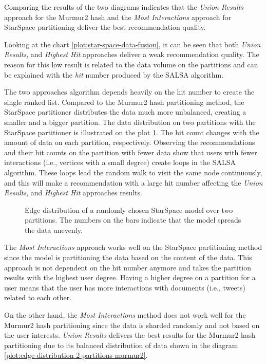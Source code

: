 Comparing the results of the two diagrams indicates that the \emph{Union Results} approach for the Murmur2 hash and the \emph{Most Interactions} approach for StarSpace partitioning deliver the best recommendation quality. 


Looking at the chart \ref{plot:star-space-data-fusion}, it can be seen that both \emph{Union Results}, and \emph{Highest Hit} approaches deliver a weak recommendation quality. The reason for this low result is related to the data volume on the partitions and can be explained with the \emph{hit} number produced by the SALSA algorithm. 


The two approaches algorithm depends heavily on the hit number to create the single ranked list. Compared to the Murmur2 hash partitioning method, the StarSpace partitioner distributes the data much more unbalanced, creating a smaller and a bigger partition. The data distribution on two partitions with the StarSpace partitioner is illustrated on the plot \ref{plot:star-space-edge-distribution-2-partitions}. The hit count changes with the amount of data on each partition, respectively. Observing the recommendations and their hit counts on the partition with fewer data show that users with fewer interactions (i.e., vertices with a small degree) create loops in the SALSA algorithm. These loops lead the random walk to visit the same node continuously, and this will make a recommendation with a large hit number affecting the \emph{Union Results}, and \emph{Highest Hit} approaches results.


\begin{figure}[!htb]
    \centering
    
    \caption{Edge distribution of a randomly chosen StarSpace model over two partitions. The numbers on the bars indicate that the model spreads the data unevenly.}
    \label{plot:star-space-edge-distribution-2-partitions}
\end{figure}


The \emph{Most Interactions} approach works well on the StarSpace partitioning method since the model is partitioning the data based on the content of the data. This approach is not dependent on the hit number anymore and takes the partition results with the highest user degree. Having a higher degree on a partition for a user means that the user has more interactions with documents (i.e., tweets) related to each other. 


On the other hand, the \emph{Most Interactions} method does not work well for the Murmur2 hash partitioning since the data is sharded randomly and not based on the user interests. \emph{Union Results} delivers the best results for the Murmur2 hash partitioning due to its balanced distribution of data shown in the diagram \ref{plot:edge-distribution-2-partitions-murmur2}. 


